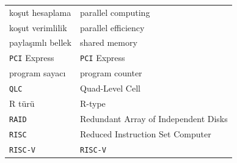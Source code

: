 {\begin{longtable}{@{}p{7.6cm}p{7.6cm}@{}}
koşut hesaplama & parallel computing \\
koşut verimlilik & parallel efficiency \\
paylaşımlı bellek & shared memory \\
\texttt{PCI} Express & \texttt{PCI} Express \\
program sayacı & program counter \\

\texttt{QLC} & Quad-Level Cell \\

R türü & R-type \\
\texttt{RAID} & Redundant Array of Independent Disks \\
\texttt{RISC} & Reduced Instruction Set Computer \\
\texttt{RISC-V} & \texttt{RISC-V} \\


\end{longtable}}
